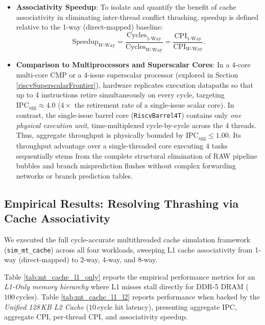 \begin{itemize}
\begin{equation}
    \end{equation}
    In an ideal stall-free barrel core, each thread experiences a per-thread CPI of $4.00$ ($\text{IPC}_{\text{thread}} = 0.25$).
    \item \textbf{Associativity Speedup}:
    To isolate and quantify the benefit of cache associativity in eliminating inter-thread conflict thrashing, speedup is defined relative to the 1-way (direct-mapped) baseline:
    \begin{equation}
    \text{Speedup}_{W\text{-Way}} = \frac{\text{Cycles}_{\text{1-Way}}}{\text{Cycles}_{W\text{-Way}}} = \frac{\text{CPI}_{\text{1-Way}}}{\text{CPI}_{W\text{-Way}}}.
    \end{equation}
    \item \textbf{Comparison to Multiprocessors and Superscalar Cores}:
    In a 4-core multi-core CMP or a 4-issue superscalar processor (explored in Section \ref{riscvSuperscalarFrontier}), hardware replicates execution datapaths so that up to 4 instructions retire simultaneously on every cycle, targeting $\text{IPC}_{\text{agg}} \approx 4.0$ ($4\times$ the retirement rate of a single-issue scalar core). In contrast, the single-issue barrel core (\texttt{RiscvBarrel4T}) contains only \textit{one physical execution unit}, time-multiplexed cycle-by-cycle across the 4 threads. Thus, aggregate throughput is physically bounded by $\text{IPC}_{\text{agg}} \le 1.00$. Its throughput advantage over a single-threaded core executing 4 tasks sequentially stems from the complete structural elimination of RAW pipeline bubbles and branch misprediction flushes without complex forwarding networks or branch prediction tables.
\end{itemize}


\subsection{Empirical Results: Resolving Thrashing via Cache Associativity}

We executed the full cycle-accurate multithreaded cache simulation framework (\texttt{sim\_mt\_cache}) across all four workloads, sweeping L1 cache associativity from 1-way (direct-mapped) to 2-way, 4-way, and 8-way.

Table \ref{tab:mt_cache_l1_only} reports the empirical performance metrics for an \textit{L1-Only memory hierarchy} where L1 misses stall directly for DDR-5 DRAM ($100\,\text{cycles}$). Table \ref{tab:mt_cache_l1_l2} reports performance when backed by the \textit{Unified 128\,KB L2 Cache} ($10\,\text{cycle}$ hit latency), presenting aggregate IPC, aggregate CPI, per-thread CPI, and associativity speedup.

